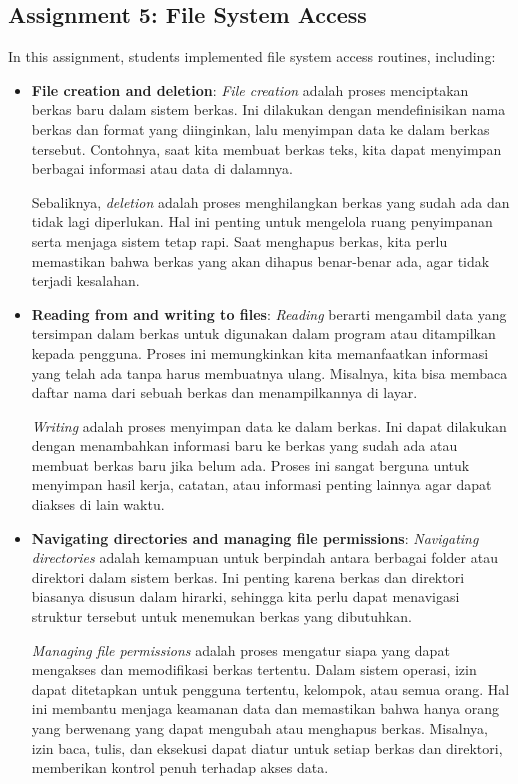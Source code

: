 \documentclass[12pt]{article}
\begin{document}
\subsection{Assignment 5: File System Access}
In this assignment, students implemented file system access routines, including:
\begin{itemize}
   \item \textbf{File creation and deletion}: \textit{File creation} adalah proses menciptakan berkas baru dalam sistem berkas. Ini dilakukan dengan mendefinisikan nama berkas dan format yang diinginkan, lalu menyimpan data ke dalam berkas tersebut. Contohnya, saat kita membuat berkas teks, kita dapat menyimpan berbagai informasi atau data di dalamnya.
    
    Sebaliknya, \textit{deletion} adalah proses menghilangkan berkas yang sudah ada dan tidak lagi diperlukan. Hal ini penting untuk mengelola ruang penyimpanan serta menjaga sistem tetap rapi. Saat menghapus berkas, kita perlu memastikan bahwa berkas yang akan dihapus benar-benar ada, agar tidak terjadi kesalahan.
    
    \item \textbf{Reading from and writing to files}: \textit{Reading} berarti mengambil data yang tersimpan dalam berkas untuk digunakan dalam program atau ditampilkan kepada pengguna. Proses ini memungkinkan kita memanfaatkan informasi yang telah ada tanpa harus membuatnya ulang. Misalnya, kita bisa membaca daftar nama dari sebuah berkas dan menampilkannya di layar.
    
    \textit{Writing} adalah proses menyimpan data ke dalam berkas. Ini dapat dilakukan dengan menambahkan informasi baru ke berkas yang sudah ada atau membuat berkas baru jika belum ada. Proses ini sangat berguna untuk menyimpan hasil kerja, catatan, atau informasi penting lainnya agar dapat diakses di lain waktu.
    
    \item \textbf{Navigating directories and managing file permissions}: \textit{Navigating directories} adalah kemampuan untuk berpindah antara berbagai folder atau direktori dalam sistem berkas. Ini penting karena berkas dan direktori biasanya disusun dalam hirarki, sehingga kita perlu dapat menavigasi struktur tersebut untuk menemukan berkas yang dibutuhkan.
    
    \textit{Managing file permissions} adalah proses mengatur siapa yang dapat mengakses dan memodifikasi berkas tertentu. Dalam sistem operasi, izin dapat ditetapkan untuk pengguna tertentu, kelompok, atau semua orang. Hal ini membantu menjaga keamanan data dan memastikan bahwa hanya orang yang berwenang yang dapat mengubah atau menghapus berkas. Misalnya, izin baca, tulis, dan eksekusi dapat diatur untuk setiap berkas dan direktori, memberikan kontrol penuh terhadap akses data.


\end{itemize}
\end{document}
